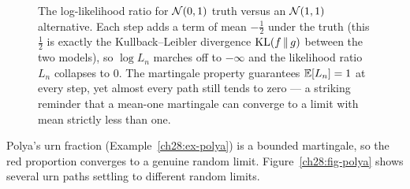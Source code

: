 \begin{figure}[H]
\centering
{}
\caption{The log-likelihood ratio for $\mathcal{N}(0,1)$ truth versus an $\mathcal{N}(1,1)$ alternative. Each
step adds a term of mean $-\tfrac12$ under the truth (this $\tfrac12$ is exactly the Kullback--Leibler
divergence $\operatorname{KL}(f\,\|\,g)$ between the two models), so $\log L_n$ marches off to $-\infty$ and the
likelihood ratio $L_n$ collapses to $0$. The martingale property guarantees $\operatorname{\mathbb{E}}[L_n] = 1$ at every
step, yet almost every path still tends to zero --- a striking reminder that a mean-one martingale can
converge to a limit with mean strictly less than one.}
\label{ch28:fig-lr}
\end{figure}

Polya's urn fraction
(Example~\ref{ch28:ex-polya}) is a bounded martingale, so the red proportion converges to a genuine
random limit. Figure~\ref{ch28:fig-polya} shows several urn paths settling to different random
limits.


